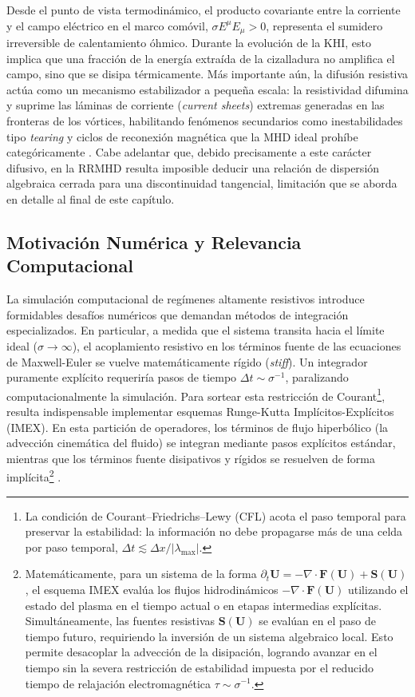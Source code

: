 Desde el punto de vista termodinámico, el producto covariante entre la corriente y el campo eléctrico en el marco comóvil, $\sigma E^\mu E_\mu > 0$, representa el sumidero irreversible de calentamiento óhmico. Durante la evolución de la KHI, esto implica que una fracción de la energía extraída de la cizalladura no amplifica el campo, sino que se disipa térmicamente. Más importante aún, la difusión resistiva actúa como un mecanismo estabilizador a pequeña escala: la resistividad difumina y suprime las láminas de corriente (\textit{current sheets}) extremas generadas en las fronteras de los vórtices, habilitando fenómenos secundarios como inestabilidades tipo \textit{tearing} y ciclos de reconexión magnética que la MHD ideal prohíbe categóricamente \parencite{palenzuela-2009}. Cabe adelantar que, debido precisamente a este carácter difusivo, en la RRMHD resulta imposible deducir una relación de dispersión algebraica cerrada para una discontinuidad tangencial, limitación que se aborda en detalle al final de este capítulo.

\subsection{Motivación Numérica y Relevancia Computacional}

\primerparrafo La simulación computacional de regímenes altamente resistivos introduce formidables desafíos numéricos que demandan métodos de integración especializados. En particular, a medida que el sistema transita hacia el límite ideal ($\sigma \to \infty$), el acoplamiento resistivo en los términos fuente de las ecuaciones de Maxwell-Euler se vuelve matemáticamente rígido (\textit{stiff}). Un integrador puramente explícito requeriría pasos de tiempo $\Delta t \sim \sigma^{-1}$, paralizando computacionalmente la simulación. Para sortear esta restricción de Courant\footnote{La condición de Courant--Friedrichs--Lewy (CFL) acota el paso temporal para preservar la estabilidad: la información no debe propagarse más de una celda por paso temporal, $\Delta t\lesssim \Delta x/|\lambda_{\max}|$.}, resulta indispensable implementar esquemas Runge-Kutta Implícitos-Explícitos (IMEX). En esta partición de operadores, los términos de flujo hiperbólico (la advección cinemática del fluido) se integran mediante pasos explícitos estándar, mientras que los términos fuente disipativos y rígidos se resuelven de forma implícita\footnote{Matemáticamente, para un sistema de la forma $\partial_t \mathbf{U} = -\nabla \cdot \mathbf{F}(\mathbf{U}) + \mathbf{S}(\mathbf{U})$, el esquema IMEX evalúa los flujos hidrodinámicos $-\nabla \cdot \mathbf{F}(\mathbf{U})$ utilizando el estado del plasma en el tiempo actual o en etapas intermedias explícitas. Simultáneamente, las fuentes resistivas $\mathbf{S}(\mathbf{U})$ se evalúan en el paso de tiempo futuro, requiriendo la inversión de un sistema algebraico local. Esto permite desacoplar la advección de la disipación, logrando avanzar en el tiempo sin la severa restricción de estabilidad impuesta por el reducido tiempo de relajación electromagnética $\tau \sim \sigma^{-1}$.} \parencite{Aloy_Cordero-Carrion:2016}.

